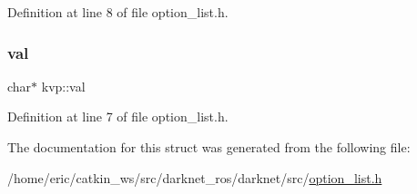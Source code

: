 Definition at line 8 of file option\+\_\+list.\+h.

\mbox{\label{structkvp_acfabb2665bc533f70cce1d708b6e6053}} 
\subsubsection{\texorpdfstring{val}{val}}
{\footnotesize\ttfamily char$\ast$ kvp\+::val}



Definition at line 7 of file option\+\_\+list.\+h.



The documentation for this struct was generated from the following file\+:\begin{DoxyCompactItemize}
\item 
/home/eric/catkin\+\_\+ws/src/darknet\+\_\+ros/darknet/src/\mbox{\hyperlink{option__list_8h}{option\+\_\+list.\+h}}\end{DoxyCompactItemize}
